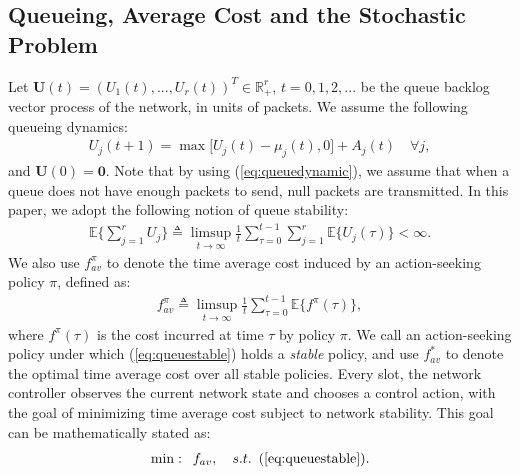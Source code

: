 \documentclass[journal]{IEEEtran}
\newcommand{\expect}[1]{\mathbb{E}\big\{#1\big\}}
\newcommand{\bv}[1]{{\boldsymbol{#1} }}
\begin{document}
\subsection{Queueing, Average Cost and the Stochastic Problem}\label{section:queuenotation}
Let $\bv{U}(t)=(U_1(t), ..., U_r(t))^T\in\mathbb{R}^r_{+}$, $t=0, 1, 2, ...$ be the queue backlog vector  process of the network, in units of packets. We assume the following queueing dynamics: %
\begin{eqnarray}
U_j(t+1)=\max\big[U_j(t)-\mu_j(t), 0\big]+A_j(t)\quad\forall j,\label{eq:queuedynamic}
\end{eqnarray}
and $\bv{U}(0)=\bv{0}$. Note that by using (\ref{eq:queuedynamic}), we assume that when a queue does not have enough packets to send, null packets are transmitted.  In this paper, we adopt the following notion of queue stability:
\begin{eqnarray}
\expect{\sum_{j=1}^rU_j}\triangleq
\limsup_{t\rightarrow\infty}\frac{1}{t}\sum_{\tau=0}^{t-1}\sum_{j=1}^{r}\expect{U_j(\tau)}<\infty.\label{eq:queuestable}
\end{eqnarray}
We also use $f^{\pi}_{av}$ to denote the time average cost induced by an action-seeking policy $\pi$, defined as:
\begin{eqnarray}
f^{\pi}_{av}\triangleq
\limsup_{t\rightarrow\infty}\frac{1}{t}\sum_{\tau=0}^{t-1}\expect{f^{\pi}(\tau)},\label{eq:timeavcost}
\end{eqnarray}
where $f^{\pi}(\tau)$ is the cost incurred at time $\tau$ by policy $\pi$. We call an action-seeking  policy under which (\ref{eq:queuestable}) holds a \emph{stable} policy, and use $f_{av}^*$ to denote the optimal time average cost over all stable policies. 
Every slot, the network controller observes the current network state and chooses a control action, with the goal of minimizing time average cost subject to network stability. This goal can be mathematically stated as:
\begin{eqnarray*}
\min: \,\,\, f_{av}, \quad s.t.\,\,\,  (\ref{eq:queuestable}).
\end{eqnarray*}
\end{document}
